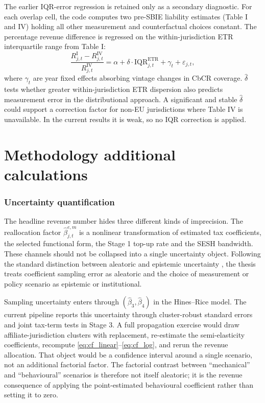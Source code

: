 \documentclass[11pt,a4paper]{article}
\begin{document}
The earlier IQR-error regression is retained only as a secondary diagnostic. For each overlap cell, the code computes two pre-SBIE liability estimates (Table I and IV) holding all other measurement and counterfactual choices constant. The percentage revenue difference is regressed on the within-jurisdiction ETR interquartile range from Table I:
\begin{equation}\label{eq:crossval_regression}
\frac{R_{j,t}^{\text{I}} - R_{j,t}^{\text{IV}}}{R_{j,t}^{\text{IV}}} = \alpha + \delta \cdot \text{IQR}_{j,t}^{\text{ETR}} + \gamma_t + \varepsilon_{j,t},
\end{equation}
where $\gamma_t$ are year fixed effects absorbing vintage changes in CbCR coverage. $\hat{\delta}$ tests whether greater within-jurisdiction ETR dispersion also predicts measurement error in the distributional approach. A significant and stable $\hat{\delta}$ could support a correction factor for non-EU jurisdictions where Table IV is unavailable. In the current results it is weak, so no IQR correction is applied.

\section{Methodology additional calculations}

\subsubsection{Uncertainty quantification}\label{sec:beta_uncertainty}

The headline revenue number hides three different kinds of imprecision. The reallocation factor $\hat{\beta}_{j,t}^{e,m}$ is a nonlinear transformation of estimated tax coefficients, the selected functional form, the Stage 1 top-up rate and the SESH bandwidth. These channels should not be collapsed into a single uncertainty object. Following the standard distinction between aleatoric and epistemic uncertainty \citep{hullermeier2021}, the thesis treats coefficient sampling error as aleatoric and the choice of measurement or policy scenario as epistemic or institutional.

Sampling uncertainty enters through $(\hat{\beta}_3,\hat{\beta}_4)$ in the Hines--Rice model. The current pipeline reports this uncertainty through cluster-robust standard errors and joint tax-term tests in Stage 3. A full propagation exercise would draw affiliate-jurisdiction clusters with replacement, re-estimate the semi-elasticity coefficients, recompute \eqref{eq:cf_linear}--\eqref{eq:cf_log}, and rerun the revenue allocation. That object would be a confidence interval around a single scenario, not an additional factorial factor. The factorial contrast between ``mechanical'' and ``behavioural'' scenarios is therefore not itself aleatoric; it is the revenue consequence of applying the point-estimated behavioural coefficient rather than setting it to zero.
\end{document}
